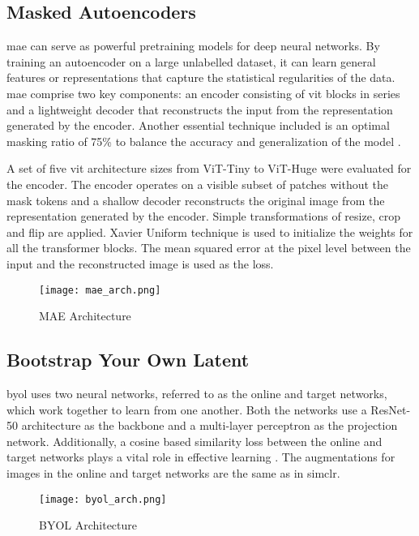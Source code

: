 \subsection{Masked Autoencoders}
\gls{mae} can serve as powerful pretraining models for deep neural networks. By training an autoencoder on a large unlabelled dataset, it can learn general features or representations that capture the statistical regularities of the data. \gls{mae} comprise two key components: an encoder consisting of \acrfull{vit} blocks in series and a lightweight decoder that reconstructs the input from the representation generated by the encoder. Another essential technique included is an optimal masking ratio of 75\% to balance the accuracy and generalization of the model \cite{he_masked_2021}.

A set of five \gls{vit} architecture sizes from ViT-Tiny to ViT-Huge were evaluated for the encoder. The encoder operates on a visible subset of patches without the mask tokens and a shallow decoder reconstructs the original image from the representation generated by the encoder. Simple transformations of resize, crop and flip are applied. Xavier Uniform technique is used to initialize the weights for all the transformer blocks. The mean squared error at the pixel level between the input and the reconstructed image is used as the loss. 

\begin{figure}[ht]
\texttt{[image: mae\_arch.png]}
\centering
\caption{MAE Architecture}
\label{fig:figure}
\end{figure}

\subsection{Bootstrap Your Own Latent}

\gls{byol} uses two neural networks, referred to as the online and target networks, which work together to learn from one another. Both the networks use a ResNet-50 architecture as the backbone and a multi-layer perceptron as the projection network. Additionally, a cosine based similarity loss between the online and target networks plays a vital role in effective learning \cite{grill_bootstrap_2020}. The augmentations for images in the online and target networks are the same as in \gls{simclr}. 

\begin{figure}[ht]
\texttt{[image: byol\_arch.png]}
\centering
\caption{BYOL Architecture}
\label{fig:figure}
\end{figure}
